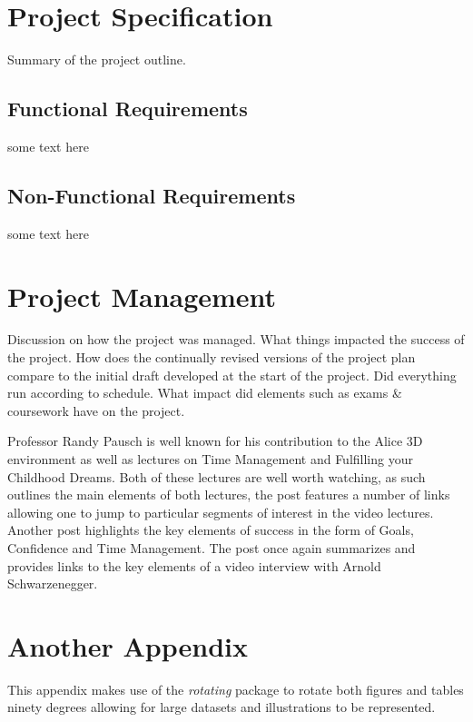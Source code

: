 \chapter{Project Specification}
Summary of the project outline.

\section{Functional Requirements}
some text here

\section{Non-Functional Requirements}
some text here

\chapter{Project Management}
Discussion on how the project was managed. What things impacted the success of the project. How does the continually revised versions of the project plan compare to the initial draft developed at the start of the project. Did everything run according to schedule. What impact did elements such as exams \& coursework have on the project. 

Professor Randy Pausch is well known for his contribution to the Alice 3D environment as well as lectures on Time Management and Fulfilling your Childhood Dreams. Both of these lectures are well worth watching, as such \cite{online:Doolan:2015:PauschLecture} outlines the main elements of both lectures, the post features a number of links allowing one to jump to particular segments of interest in the video lectures. Another post \cite{online:Doolan:2016:SchwarzeneggerInterview} highlights the key elements of success in the form of Goals, Confidence and Time Management. The post once again summarizes and provides links to the key elements of a video interview with Arnold Schwarzenegger.

\chapter{Another Appendix}

This appendix makes use of the \emph{rotating} package to rotate both figures and tables ninety degrees allowing for large datasets and illustrations to be represented.

